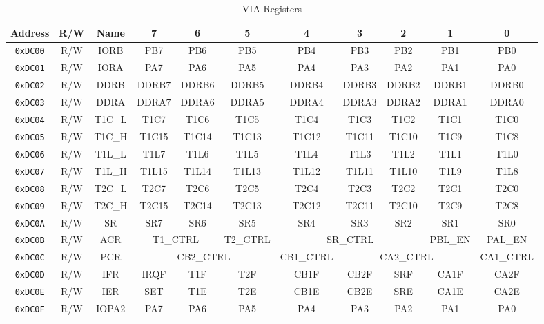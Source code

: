 \begin{table}[h]
    \begin{center}
        \begin{tabular}{|c|c|c|c|c|c|c|c|c|c|c|} \hline
            Address & R/W & Name & 7 & 6 & 5 & 4 & 3 & 2 & 1 & 0 \\\hline\hline
            \verb+0xDC00+ & R/W & IORB & PB7 & PB6 & PB5 & PB4 & PB3 & PB2 & PB1 & PB0 \\ \hline
            \verb+0xDC01+ & R/W & IORA & PA7 & PA6 & PA5 & PA4 & PA3 & PA2 & PA1 & PA0 \\ \hline
            \verb+0xDC02+ & R/W & DDRB & DDRB7 & DDRB6 & DDRB5 & DDRB4 & DDRB3 & DDRB2 & DDRB1 & DDRB0 \\ \hline
            \verb+0xDC03+ & R/W & DDRA & DDRA7 & DDRA6 & DDRA5 & DDRA4 & DDRA3 & DDRA2 & DDRA1 & DDRA0 \\ \hline
            \verb+0xDC04+ & R/W & T1C\_L & T1C7 & T1C6 & T1C5 & T1C4 & T1C3 & T1C2 & T1C1 & T1C0 \\ \hline
            \verb+0xDC05+ & R/W & T1C\_H & T1C15 & T1C14 & T1C13 & T1C12 & T1C11 & T1C10 & T1C9 & T1C8 \\ \hline
            \verb+0xDC06+ & R/W & T1L\_L & T1L7 & T1L6 & T1L5 & T1L4 & T1L3 & T1L2 & T1L1 & T1L0 \\ \hline
            \verb+0xDC07+ & R/W & T1L\_H & T1L15 & T1L14 & T1L13 & T1L12 & T1L11 & T1L10 & T1L9 & T1L8 \\ \hline
            \verb+0xDC08+ & R/W & T2C\_L & T2C7 & T2C6 & T2C5 & T2C4 & T2C3 & T2C2 & T2C1 & T2C0 \\ \hline
            \verb+0xDC09+ & R/W & T2C\_H & T2C15 & T2C14 & T2C13 & T2C12 & T2C11 & T2C10 & T2C9 & T2C8\\ \hline
            \verb+0xDC0A+ & R/W & SR & SR7 & SR6 & SR5 & SR4 & SR3 & SR2 & SR1 & SR0 \\ \hline
            \verb+0xDC0B+ & R/W & ACR & \multicolumn{2}{|c|}{T1\_CTRL} & T2\_CTRL & \multicolumn{3}{|c|}{SR\_CTRL} & PBL\_EN & PAL\_EN \\ \hline
            \verb+0xDC0C+ & R/W & PCR & \multicolumn{3}{|c|}{CB2\_CTRL} & CB1\_CTRL & \multicolumn{3}{|c|}{CA2\_CTRL} & CA1\_CTRL \\ \hline
            \verb+0xDC0D+ & R/W & IFR & IRQF & T1F & T2F & CB1F & CB2F & SRF & CA1F & CA2F \\ \hline
            \verb+0xDC0E+ & R/W & IER & SET & T1E & T2E & CB1E & CB2E & SRE & CA1E & CA2E \\ \hline
            \verb+0xDC0F+ & R/W & IOPA2 & PA7 & PA6 & PA5 & PA4 & PA3 & PA2 & PA1 & PA0 \\ \hline
        \end{tabular}
    \end{center}
    \caption{VIA Registers}
    \label{tab:via_reg}
\end{table}

